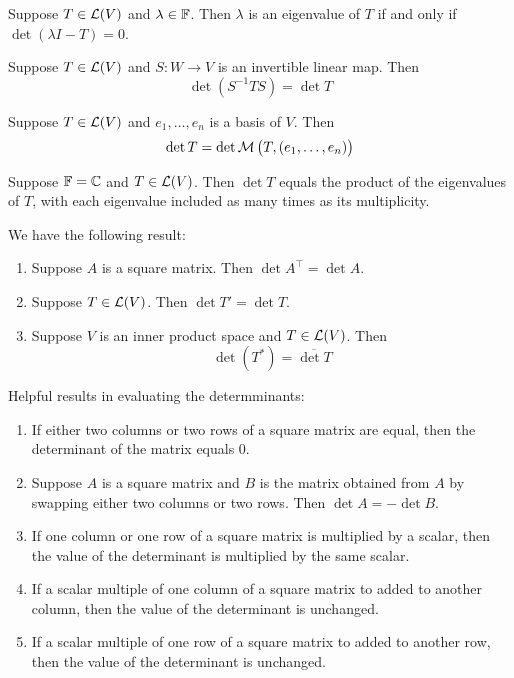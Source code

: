 \documentclass{extarticle}
\begin{document}
\begin{corollary}
    Suppose \(T \in \mathcal{L}(V)\) and \(\lambda \in \mathbb{F}\). Then \(\lambda\) is an eigenvalue of \(T\) if and 
    only if \(\det (\lambda I - T) = 0\).
\end{corollary}

\begin{corollary}
    Suppose \(T \in \mathcal{L}(V)\) and \(S \colon W \to V\) is an invertible linear map. Then 
    \[\det (S^{-1} T S) = \det T\]
\end{corollary}

\begin{corollary}
    Suppose \(T \in \mathcal{L}(V)\) and \(e_1, \ldots, e_n\) is a basis of \(V\). Then 
    \[\det T = \det \mathcal{M} \left( T, (e_1, \ldots, e_n) \right)\]
\end{corollary}

\begin{corollary}
    Suppose \(\mathbb{F} = \mathbb{C}\) and \(T \in \mathcal{L}(V)\). Then \(\det T\) equals the product of the eigenvalues of 
    \(T\), with each eigenvalue included as many times as its multiplicity. 
\end{corollary}

\begin{corollary}
    We have the following result: 
    \begin{enumerate}[label=(\alph*)]
        \item Suppose \(A\) is a square matrix. Then \(\det A^\top = \det A\). 
        \item Suppose \(T \in \mathcal{L}(V)\). Then \(\det T' = \det T\). 
        \item Suppose \(V\) is an inner product space and \(T \in \mathcal{L}(V)\). Then 
        \[\det (T^*) = \overline{\det T}\]
    \end{enumerate}
\end{corollary}

\begin{corollary}
    Helpful results in evaluating the determminants: 

    \begin{enumerate}[label=(\alph*)]
        \item If either two columns or two rows of a square matrix are equal, then the determinant of the 
        matrix equals 0. 
        \item Suppose \(A\) is a square matrix and \(B\) is the matrix obtained from \(A\) by swapping either 
        two columns or two rows. Then \(\det A = - \det B\).
        \item If one column or one row of a square matrix is multiplied by a scalar, then the value of the 
        determinant is multiplied by the same scalar. 
        \item If a scalar multiple of one column of a square matrix to added to another column, then the value 
        of the determinant is unchanged. 
        \item If a scalar multiple of one row of a square matrix to added to another row, then the value of 
        the determinant is unchanged. 
    \end{enumerate}
\end{corollary}
\end{document}
